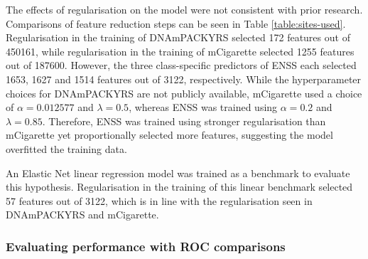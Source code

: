\documentclass[draft]{article} %
\begin{document}
The effects of regularisation on the model were not consistent with prior research. Comparisons of feature reduction steps can be seen in Table \ref{table:sites-used}. Regularisation in the training of DNAmPACKYRS selected 172 features out of \num{450161}, while regularisation in the training of mCigarette selected \num{1255} features out of \num{187600}. However, the three class-specific predictors of ENSS each selected 1653, 1627 and 1514 features out of 3122, respectively. While the hyperparameter choices for DNAmPACKYRS are not publicly available, mCigarette used a choice of \(\alpha = 0.012577\) and \(\lambda = 0.5\), whereas ENSS was trained using \(\alpha = 0.2\) and \(\lambda = 0.85\). Therefore, ENSS was trained using stronger regularisation than mCigarette yet proportionally selected more features, suggesting the model overfitted the training data.

An Elastic Net linear regression model was trained as a benchmark to evaluate this hypothesis. Regularisation in the training of this linear benchmark selected 57 features out of 3122, which is in line with the regularisation seen in DNAmPACKYRS and mCigarette.

\newpage
\subsubsection{Evaluating performance with ROC comparisons}
\end{document}
